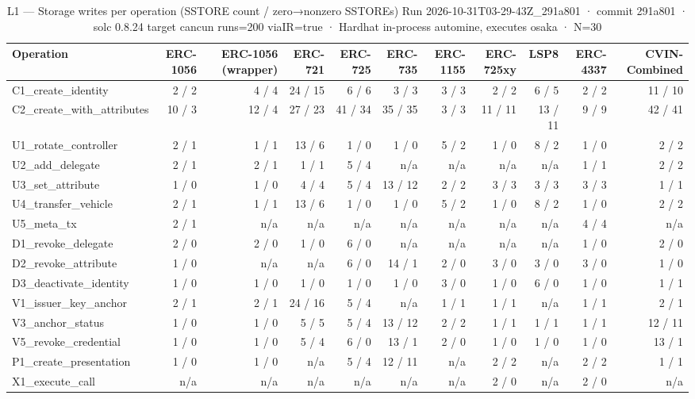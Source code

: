 \begin{table}[ht]
\centering
\small
\begin{tabular}{lrrrrrrrrrr}
\toprule
Operation & ERC-1056 & ERC-1056 (wrapper) & ERC-721 & ERC-725 & ERC-735 & ERC-1155 & ERC-725xy & LSP8 & ERC-4337 & CVIN-Combined \\
\midrule
C1\_create\_identity & 2 / 2 & 4 / 4 & 24 / 15 & 6 / 6 & 3 / 3 & 3 / 3 & 2 / 2 & 6 / 5 & 2 / 2 & 11 / 10 \\
C2\_create\_with\_attributes & 10 / 3 & 12 / 4 & 27 / 23 & 41 / 34 & 35 / 35 & 3 / 3 & 11 / 11 & 13 / 11 & 9 / 9 & 42 / 41 \\
U1\_rotate\_controller & 2 / 1 & 1 / 1 & 13 / 6 & 1 / 0 & 1 / 0 & 5 / 2 & 1 / 0 & 8 / 2 & 1 / 0 & 2 / 2 \\
U2\_add\_delegate & 2 / 1 & 2 / 1 & 1 / 1 & 5 / 4 & n/a & n/a & n/a & n/a & 1 / 1 & 2 / 2 \\
U3\_set\_attribute & 1 / 0 & 1 / 0 & 4 / 4 & 5 / 4 & 13 / 12 & 2 / 2 & 3 / 3 & 3 / 3 & 3 / 3 & 1 / 1 \\
U4\_transfer\_vehicle & 2 / 1 & 1 / 1 & 13 / 6 & 1 / 0 & 1 / 0 & 5 / 2 & 1 / 0 & 8 / 2 & 1 / 0 & 2 / 2 \\
U5\_meta\_tx & 2 / 1 & n/a & n/a & n/a & n/a & n/a & n/a & n/a & 4 / 4 & n/a \\
D1\_revoke\_delegate & 2 / 0 & 2 / 0 & 1 / 0 & 6 / 0 & n/a & n/a & n/a & n/a & 1 / 0 & 2 / 0 \\
D2\_revoke\_attribute & 1 / 0 & n/a & n/a & 6 / 0 & 14 / 1 & 2 / 0 & 3 / 0 & 3 / 0 & 3 / 0 & 1 / 0 \\
D3\_deactivate\_identity & 1 / 0 & 1 / 0 & 1 / 0 & 1 / 0 & 1 / 0 & 3 / 0 & 1 / 0 & 6 / 0 & 1 / 0 & 1 / 1 \\
V1\_issuer\_key\_anchor & 2 / 1 & 2 / 1 & 24 / 16 & 5 / 4 & n/a & 1 / 1 & 1 / 1 & n/a & 1 / 1 & 2 / 1 \\
V3\_anchor\_status & 1 / 0 & 1 / 0 & 5 / 5 & 5 / 4 & 13 / 12 & 2 / 2 & 1 / 1 & 1 / 1 & 1 / 1 & 12 / 11 \\
V5\_revoke\_credential & 1 / 0 & 1 / 0 & 5 / 4 & 6 / 0 & 13 / 1 & 2 / 0 & 1 / 0 & 1 / 0 & 1 / 0 & 13 / 1 \\
P1\_create\_presentation & 1 / 0 & 1 / 0 & n/a & 5 / 4 & 12 / 11 & n/a & 2 / 2 & n/a & 2 / 2 & 1 / 1 \\
X1\_execute\_call & n/a & n/a & n/a & n/a & n/a & n/a & 2 / 0 & n/a & 2 / 0 & n/a \\
\bottomrule
\end{tabular}
\caption{L1 — Storage writes per operation (SSTORE count / zero→nonzero SSTOREs) Run 2026-10-31T03-29-43Z\_291a801 · commit 291a801 · solc 0.8.24 target cancun runs=200 viaIR=true · Hardhat in-process automine, executes osaka · N=30}
\label{tab:crud_storage}
\end{table}
